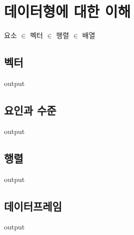 \documentclass{book}
\begin{document}
\section{데이터형에 대한 이해}


요소 $\in$ 벡터 $\in$ 행렬 $\in$ 배열 

\subsection{벡터}

\begin{Schunk}
\begin{Soutput}
output
\end{Soutput}
\end{Schunk}

\subsection{요인과 수준}

\begin{Schunk}
\begin{Soutput}
output
\end{Soutput}
\end{Schunk}

\subsection{행렬}

\begin{Schunk}
\begin{Soutput}
output
\end{Soutput}
\end{Schunk}

\subsection{데이터프레임}

\begin{Schunk}
\begin{Soutput}
output
\end{Soutput}
\end{Schunk}
\end{document}
